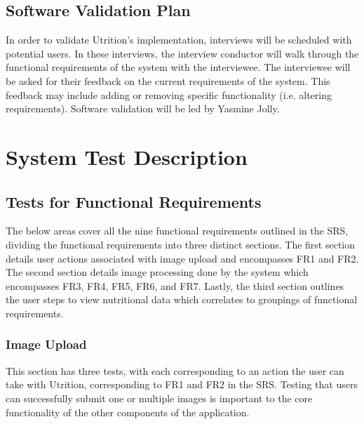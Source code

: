 \documentclass[12pt, titlepage]{article}
\begin{document}
	\subsection{Software Validation Plan}
	
	
	
	
	In order to validate Utrition's implementation, interviews will be scheduled with potential users. In these interviews, the interview conductor will walk through the functional requirements of the system with the interviewee. The interviewee will be asked for their feedback on the current requirements of the system. This feedback may include adding or removing specific functionality (i.e. altering requirements). Software validation will be led by Yasmine Jolly. 
	
	\section{System Test Description}
	
	\subsection{Tests for Functional Requirements}
	The below areas cover all the nine functional requirements outlined in the SRS, dividing the functional requirements into three distinct sections. The first section details user actions associated with image upload and encompasses FR1 and FR2. The second section details image processing done by the system which encompasses FR3, FR4, FR5, FR6, and FR7. Lastly, the third section outlines the user steps to view nutritional data which correlates to groupings of functional requirements.
	
	\subsubsection{Image Upload}
	This section has three tests, with each corresponding to an action the user 
	can take with Utrition, corresponding to FR1 and FR2 in the SRS. 
	Testing that users can successfully submit one or multiple images is 
	important to the core functionality of the other components of the 
	application.
	
\end{document}
